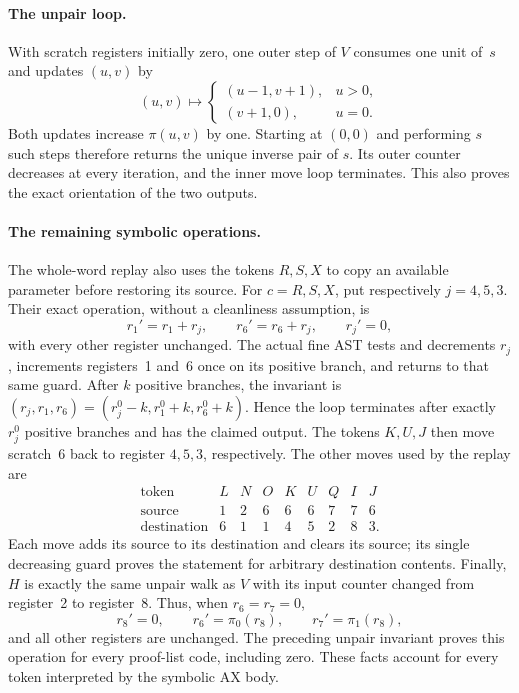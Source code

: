 \paragraph{The unpair loop.}
With scratch registers initially zero, one outer step of $V$ consumes one
unit of~$s$ and updates $(u,v)$ by
\[
 (u,v)\longmapsto
 \begin{cases}(u-1,v+1),&u>0,\\(v+1,0),&u=0.
 \end{cases}
\]
Both updates increase $\pi(u,v)$ by one.  Starting at $(0,0)$ and performing
$s$ such steps therefore returns the unique inverse pair of $s$.  Its outer
counter decreases at every iteration, and the inner move loop terminates.
This also proves the exact orientation of the two outputs.

\paragraph{The remaining symbolic operations.}
The whole-word replay also uses the tokens $R,S,X$ to copy an available
parameter before restoring its source.  For $c=R,S,X$, put respectively
$j=4,5,3$.  Their exact operation, without a cleanliness assumption, is
\[
 r_1'=r_1+r_j,\qquad r_6'=r_6+r_j,\qquad r_j'=0,
\]
with every other register unchanged.  The actual fine AST tests and
decrements $r_j$, increments registers~1 and~6 once on its positive branch,
and returns to that same guard.  After $k$ positive branches, the invariant
is $(r_j,r_1,r_6)=(r_j^0-k,r_1^0+k,r_6^0+k)$.  Hence the loop terminates
after exactly $r_j^0$ positive branches and has the claimed output.  The
tokens $K,U,J$ then move scratch~6 back to register $4,5,3$, respectively.
The other moves used by the replay are
\[
\begin{array}{c|rrrrrrrr}
\text{token}&L&N&O&K&U&Q&I&J\\\hline
\text{source}&1&2&6&6&6&7&7&6\\
\text{destination}&6&1&1&4&5&2&8&3.
\end{array}
\]
Each move adds its source to its destination and clears its source; its
single decreasing guard proves the statement for arbitrary destination
contents.  Finally, $H$ is exactly the same unpair walk as $V$ with its
input counter changed from register~2 to register~8.  Thus, when $r_6=r_7=0$,
\[
 r_8'=0,\qquad r_6'=\pi_0(r_8),\qquad r_7'=\pi_1(r_8),
\]
and all other registers are unchanged.  The preceding unpair invariant
proves this operation for every proof-list code, including zero.  These
facts account for every token interpreted by the symbolic AX body.


